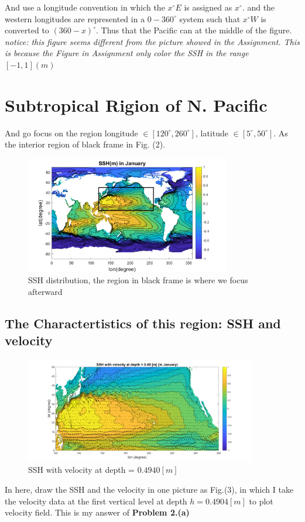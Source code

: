\documentclass[12pt]{article}
\begin{document}
\begin{CJK*}{UTF8}{bsmi}
And  use a longitude convention in which the $x^\circ E$ is assigned as $x^\circ$. and the western longitudes are represented in a $0-360^\circ$ system such that $x^\circ W$ is converted to $(360-x)^\circ$. Thus that the Pacific can at the middle of the figure.\\

\textit{notice: this figure seems different from the picture showed in the Assignment. This is because the Figure in Assignment only color the SSH in the range $[-1, 1](m)$}
\newpage
\section{Subtropical Rigion of N. Pacific}
\qquad And go focus on the region longitude $\in [120^\circ, 260^\circ]$, latitude $\in [5^\circ, 50^\circ]$. As the interior region of black frame in Fig. (2).
\begin{figure}[h]
 	\centering
	\includegraphics[width=0.8\textwidth]{Fig1a2.pdf}
	\caption{SSH distribution, the region in black frame is where we focus afterward}
\end{figure}
\subsection{The Charactertistics of this region: SSH and velocity}
\begin{figure}[h]
 	\centering
	\includegraphics[width=0.9\textwidth]{Fig2a1.pdf}
	\caption{SSH with velocity at depth  = $0.4940 [m]$}
\end{figure}
In here, draw the SSH and the velocity in one picture as Fig.(3), in which I take the velocity data at the first vertical level at depth $h = 0.4904 [m]$ to plot velocity field. This is my answer of \textbf{Problem 2.(a)}
\newpage

\end{CJK*}
\end{document}
